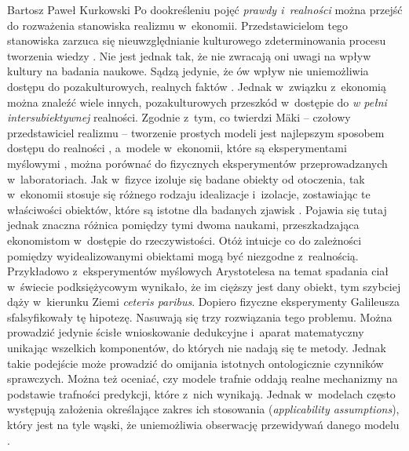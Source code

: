 \begin{artplenv}{Bartosz Paweł Kurkowski}
Po dookreśleniu pojęć \textit{prawdy i~realności }można przejść do rozważenia stanowiska realizmu w~ekonomii.
Przedstawicielom tego stanowiska zarzuca się nieuwzględnianie kulturowego zdeterminowania procesu tworzenia wiedzy
\parencite[s.~396]{zboron_podzial_2014}.
Nie jest jednak tak, że nie zwracają oni uwagi na wpływ kultury na
badania naukowe. Sądzą jedynie, że ów wpływ nie uniemożliwia dostępu do pozakulturowych, realnych faktów
\parencite[s.~72]{kincaid_realistic_2009}.
Jednak w~związku z~ekonomią można znaleźć wiele innych, pozakulturowych
przeszkód w~dostępie do \textit{w pełni intersubiektywnej} realności. Zgodnie z~tym, co twierdzi Mäki -- czołowy
przedstawiciel realizmu -- tworzenie prostych modeli jest najlepszym sposobem dostępu do realności
\parencite[s.~18]{kincaid_realistic_2009},
a~modele w~ekonomii, które są eksperymentami myślowymi
\parencite[s.~16]{kincaid_realistic_2009},
można porównać do fizycznych eksperymentów
przeprowadzanych w~laboratoriach. Jak w~fizyce izoluje się badane obiekty od otoczenia,
tak w~ekonomii stosuje się różnego rodzaju
idealizacje i~izolacje, zostawiając te właściwości obiektów, które są istotne dla badanych zjawisk
\parencite[s.~14]{kincaid_realistic_2009}.
Pojawia się tutaj jednak znaczna różnica pomiędzy tymi dwoma naukami,
przeszkadzająca ekonomistom w~dostępie do rzeczywistości. Otóż intuicje co do zależności pomiędzy wyidealizowanymi
obiektami mogą być niezgodne z~realnością. Przykładowo z~eksperymentów myślowych Arystotelesa na temat spadania
ciał w~świecie podksiężycowym wynikało, że im cięższy jest dany obiekt, tym szybciej dąży w~kierunku Ziemi \textit{ceteris
paribus}. Dopiero fizyczne eksperymenty Galileusza sfalsyfikowały tę hipotezę. Nasuwają się trzy rozwiązania tego
problemu. Można prowadzić jedynie ścisłe wnioskowanie dedukcyjne i~aparat matematyczny unikając wszelkich komponentów,
do których nie nadają się te metody. Jednak takie podejście może prowadzić do omijania istotnych ontologicznie
czynników sprawczych. Można też oceniać, czy modele trafnie oddają realne mechanizmy na podstawie trafności predykcji,
które z~nich wynikają. Jednak w~modelach często występują założenia określające zakres ich stosowania
(\textit{applicability assumptions}), który jest na tyle wąski, że uniemożliwia obserwację przewidywań danego modelu
\parencite[s.~264]{gorazda_filozofia_2014}.

\end{artplenv}
